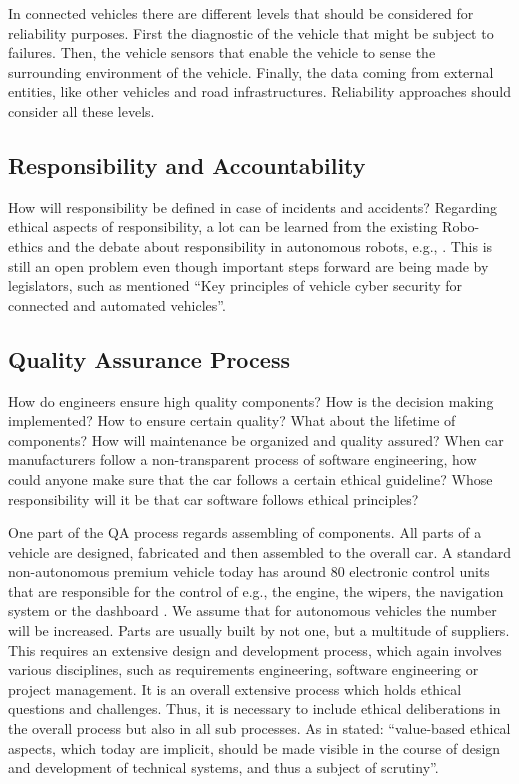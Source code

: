 In connected vehicles there are different levels that should be considered for reliability purposes. First the diagnostic of the vehicle that might be subject to failures. Then, the vehicle sensors that enable the vehicle to sense the surrounding environment of the vehicle. Finally, the data coming from external entities, like other vehicles and road infrastructures. Reliability approaches should consider all these levels.


\subsection{Responsibility and Accountability}
\label{sec:EAofTC:ResponsibilityAndAccountability}

How will responsibility be defined in case of incidents and accidents? Regarding ethical aspects of responsibility, a lot can be learned from the existing Robo-ethics and the debate about responsibility in autonomous robots, e.g., \cite{Dodig-Crnkovic:2008:SMR:1566864.1566888}. This is still an open problem even though important steps forward are being made by legislators, such as mentioned \enquote{Key principles of vehicle cyber security for connected and automated vehicles}.


\subsection{Quality Assurance Process}
\label{sec:EAofTC:QualityAssuranceProcess}

How do engineers ensure high quality components? How is the decision making implemented? How to ensure certain quality? What about the lifetime of components? How will maintenance be organized and quality assured?
When car manufacturers follow a non-transparent process of software engineering, how could anyone make sure that the car follows a certain ethical guideline? Whose responsibility will it be that car software follows ethical principles?

One part of the QA  process regards assembling of components. All parts of a vehicle are designed, fabricated and then assembled to the overall car. A standard non-autonomous premium vehicle today has around 80 electronic control units that are responsible for the control of e.g., the engine, the wipers, the navigation system or the dashboard \cite{BoschGmbH2013}. We assume that for autonomous vehicles the number will be increased. Parts are usually built by not one, but a multitude of suppliers. This requires an extensive design and development process, which again involves various disciplines, such as requirements engineering, software engineering or project management. It is an overall extensive process which holds ethical questions and challenges. Thus, it is necessary to include ethical deliberations in the overall process but also in all sub processes. As in \cite{Sapienza2016a} stated: \enquote{value-based ethical aspects, which today are implicit, should be made visible in the course of design and development of technical systems, and thus a subject of scrutiny}. 

